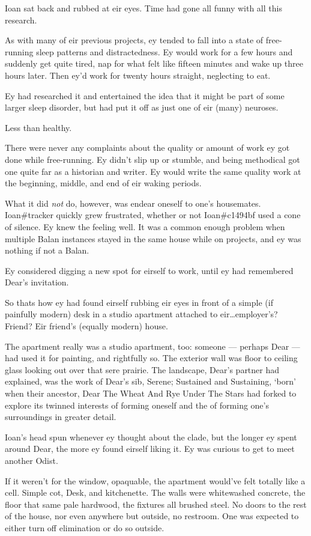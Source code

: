 Ioan sat back and rubbed at eir eyes. Time had gone all funny with all this research.

As with many of eir previous projects, ey tended to fall into a state of free-running sleep patterns and distractedness. Ey would work for a few hours and suddenly get quite tired, nap for what felt like fifteen minutes and wake up three hours later. Then ey'd work for twenty hours straight, neglecting to eat.

Ey had researched it and entertained the idea that it might be part of some larger sleep disorder, but had put it off as just one of eir (many) neuroses.

Less than healthy.

There were never any complaints about the quality or amount of work ey got done while free-running. Ey didn't slip up or stumble, and being methodical got one quite far as a historian and writer. Ey would write the same quality work at the beginning, middle, and end of eir waking periods.

What it did \emph{not} do, however, was endear oneself to one's housemates. Ioan\#tracker quickly grew frustrated, whether or not Ioan\#c1494bf used a cone of silence. Ey knew the feeling well. It was a common enough problem when multiple Balan instances stayed in the same house while on projects, and ey was nothing if not a Balan.

Ey considered digging a new spot for eirself to work, until ey had remembered Dear's invitation.

So thats how ey had found eirself rubbing eir eyes in front of a simple (if painfully modern) desk in a studio apartment attached to eir\ldots{}employer's? Friend? Eir friend's (equally modern) house.

The apartment really was a studio apartment, too: someone --- perhaps Dear --- had used it for painting, and rightfully so. The exterior wall was floor to ceiling glass looking out over that sere prairie. The landscape, Dear's partner had explained, was the work of Dear's sib, Serene; Sustained and Sustaining, `born' when their ancestor, Dear The Wheat And Rye Under The Stars had forked to explore its twinned interests of forming oneself and the of forming one's surroundings in greater detail.

Ioan's head spun whenever ey thought about the clade, but the longer ey spent around Dear, the more ey found eirself liking it. Ey was curious to get to meet another Odist.

If it weren't for the window, opaquable, the apartment would've felt totally like a cell. Simple cot, Desk, and kitchenette. The walls were whitewashed concrete, the floor that same pale hardwood, the fixtures all brushed steel. No doors to the rest of the house, nor even anywhere but outside, no restroom. One was expected to either turn off elimination or do so outside.

